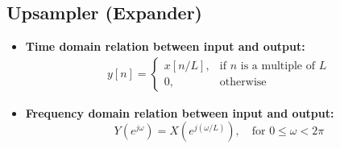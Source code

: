 \documentclass{article}
\begin{document}
\subsection*{Upsampler (Expander)}
\begin{itemize}
    \item \textbf{Time domain relation between input and output:}
    \begin{align*}
    y[n] = \begin{cases}
    x[n/L], & \text{if } n \text{ is a multiple of } L \\
    0, & \text{otherwise}
\end{cases}
       \end{align*}
   
    
    \item \textbf{Frequency domain relation between input and output:}
    \[
    Y(e^{j\omega}) = X(e^{j(\omega/L)}), \quad \text{for } 0 \leq \omega < 2\pi
    \]
\end{itemize}
\end{document}
